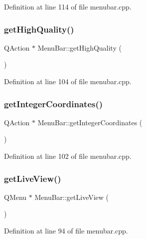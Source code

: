 Definition at line 114 of file menubar.\+cpp.

\mbox{\label{class_menu_bar_a3dfab36f8b07cb9040b3f52a87b361c2}} 
\subsubsection{\texorpdfstring{getHighQuality()}{getHighQuality()}}
{\footnotesize\ttfamily Q\+Action $\ast$ Menu\+Bar\+::get\+High\+Quality (\begin{DoxyParamCaption}{ }\end{DoxyParamCaption})}



Definition at line 104 of file menubar.\+cpp.

\mbox{\label{class_menu_bar_ae18577d25e042483212efebee94a166e}} 
\subsubsection{\texorpdfstring{getIntegerCoordinates()}{getIntegerCoordinates()}}
{\footnotesize\ttfamily Q\+Action $\ast$ Menu\+Bar\+::get\+Integer\+Coordinates (\begin{DoxyParamCaption}{ }\end{DoxyParamCaption})}



Definition at line 102 of file menubar.\+cpp.

\mbox{\label{class_menu_bar_a76f93e93d4ffef1ad344cf94a78daddd}} 
\subsubsection{\texorpdfstring{getLiveView()}{getLiveView()}}
{\footnotesize\ttfamily Q\+Menu $\ast$ Menu\+Bar\+::get\+Live\+View (\begin{DoxyParamCaption}{ }\end{DoxyParamCaption})}



Definition at line 94 of file menubar.\+cpp.

